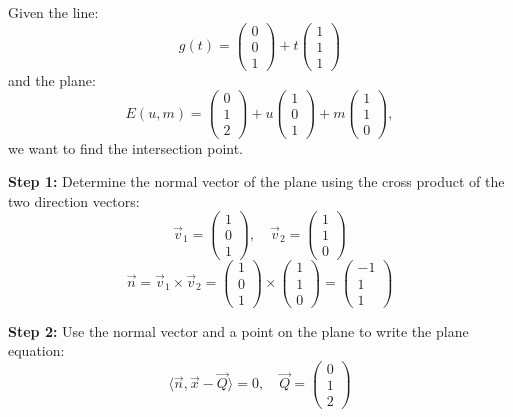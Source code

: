 Given the line:
\[
	g(t) = \begin{pmatrix} 0 \\ 0 \\ 1 \end{pmatrix} + t \begin{pmatrix} 1 \\ 1 \\ 1 \end{pmatrix}
\]
and the plane:
\[
	E(u, m) = \begin{pmatrix} 0 \\ 1 \\ 2 \end{pmatrix} + u \begin{pmatrix} 1 \\ 0 \\ 1 \end{pmatrix} + m \begin{pmatrix} 1 \\ 1 \\ 0 \end{pmatrix},
\]
we want to find the intersection point.

\textbf{Step 1:} Determine the normal vector of the plane using the cross product of the two direction vectors:
\[
	\vec{v}_1 = \begin{pmatrix} 1 \\ 0 \\ 1 \end{pmatrix}, \quad \vec{v}_2 = \begin{pmatrix} 1 \\ 1 \\ 0 \end{pmatrix}
\]
\[
	\vec{n} = \vec{v}_1 \times \vec{v}_2 =
	\begin{pmatrix} 1 \\ 0 \\ 1 \end{pmatrix} \times \begin{pmatrix} 1 \\ 1 \\ 0 \end{pmatrix} =
	\begin{pmatrix} -1 \\ 1 \\ 1 \end{pmatrix}
\]

\textbf{Step 2:} Use the normal vector and a point on the plane to write the plane equation:
\[
	\langle \vec{n}, \vec{x} - \vec{Q} \rangle = 0, \quad \vec{Q} = \begin{pmatrix} 0 \\ 1 \\ 2 \end{pmatrix}
\]

